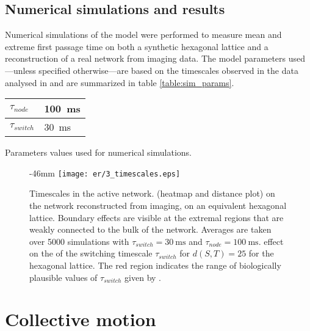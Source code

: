 \subsection{Numerical simulations and results}

Numerical simulations of the model were performed to measure mean and extreme first passage time on both a synthetic hexagonal lattice and a reconstruction of a real network from  imaging data. The model parameters used---unless specified otherwise---are based on the timescales observed in the  data analysed in  and are summarized in table \ref{table:sim_params}.


\begin{margintable}
  \sffamily
  \begin{tabular}{@{}ll@{}}
    $\tau_{node}$   & \SI{100}{\milli\second}  \\
    \hline
    $\tau_{switch}$ & \SI{30}{\milli\second}  \\
    \hline
  \end{tabular}
  \caption{Parameters values used for numerical simulations.}\label{table:sim_params}
\end{margintable}

\begin{figure}
  \begin{adjustwidth*}{}{-46mm}
    \texttt{[image: er/3\_timescales.eps]}%
    {{\label{fig:ts_er}}%
    {\label{fig:ts_hex}}%
    {\label{fig:ts_switching}}}%
    \caption{Timescales in the active network.
    \enspace {} (heatmap and distance plot) on the network reconstructed from  imaging, \enspace {} on an equivalent hexagonal lattice. Boundary effects are visible at the extremal regions that are weakly connected to the bulk of the network. Averages are taken over 5000 simulations with $\tau_{switch} = \SI{30}{\milli\second}$ and $\tau_{node} = \SI{100}{\milli\second}$.
    \enspace effect on the  of the switching timescale $\tau_{switch}$ for $d(S, T) = 25$ for the hexagonal lattice. The red region indicates the range of biologically plausible values of $\tau_{switch}$ given by \cite{holcman2018single}.\label{fig:ts}}

  \end{adjustwidth*}
\end{figure}

\section{Collective motion}
